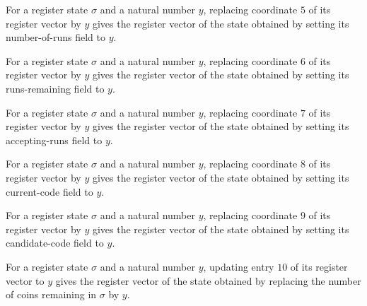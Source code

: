 \begin{lemma}
\label{Randomized.PolyAmp.Reg.u_5}
\leanok
{}
For a register state $\sigma$ and a natural number $y$, replacing coordinate $5$ of its
register vector by $y$ gives the register vector of the state obtained by setting its
number-of-runs field to $y$.
\end{lemma}

\begin{lemma}
\label{Randomized.PolyAmp.Reg.u_6}
\leanok
{}
For a register state $\sigma$ and a natural number $y$, replacing coordinate $6$ of its
register vector by $y$ gives the register vector of the state obtained by setting its
runs-remaining field to $y$.
\end{lemma}

\begin{lemma}
\label{Randomized.PolyAmp.Reg.u_7}
\leanok
{}
For a register state $\sigma$ and a natural number $y$, replacing coordinate $7$ of its
register vector by $y$ gives the register vector of the state obtained by setting its
accepting-runs field to $y$.
\end{lemma}

\begin{lemma}
\label{Randomized.PolyAmp.Reg.u_8}
\leanok
{}
For a register state $\sigma$ and a natural number $y$, replacing coordinate $8$ of its
register vector by $y$ gives the register vector of the state obtained by setting its
current-code field to $y$.
\end{lemma}

\begin{lemma}
\label{Randomized.PolyAmp.Reg.u_9}
\leanok
{}
For a register state $\sigma$ and a natural number $y$, replacing coordinate $9$ of its
register vector by $y$ gives the register vector of the state obtained by setting its
candidate-code field to $y$.
\end{lemma}

\begin{lemma}
\label{Randomized.PolyAmp.Reg.u_10}
\leanok
{}
For a register state $\sigma$ and a natural number $y$, updating entry $10$ of its
register vector to $y$ gives the register vector of the state obtained by replacing the
number of coins remaining in $\sigma$ by $y$.
\end{lemma}

